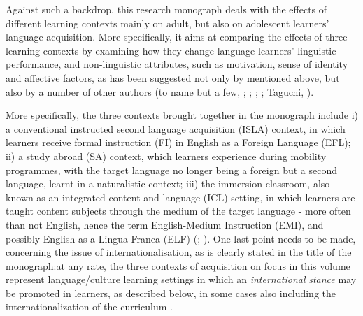 Against such a backdrop, this research monograph deals with the effects of different learning contexts mainly on adult, but also on adolescent learners’ language acquisition. More specifically, it aims at comparing the effects of three learning contexts by examining how they change language learners’ linguistic performance, and non-linguistic attributes, such as motivation, sense of identity and affective factors, as has been suggested not only by \citet{CollentineFreed2004b} mentioned above, but also by a number of other authors (to name but a few, \citealt{Pellegrino2005}; \citealt{Dewaele2007}; \citealt{Hernández2010}; \citealt{LasagabasterDoiz2014}; Taguchi, \citealt{XiaoLi2017}). 

More specifically, the three contexts brought together in the monograph include i) a conventional instructed second language acquisition (ISLA) context, in which learners receive formal instruction (FI) in English as a Foreign Language (EFL); ii) a study abroad (SA) context, which learners experience during mobility programmes, with the target language no longer being a foreign but a second language, learnt in a naturalistic context; iii) the immersion classroom, also known as an integrated content and language (ICL) setting, in which learners are taught content subjects through the medium of the target language - more often than not English, hence the term  English-Medium Instruction (EMI), and possibly English as a Lingua Franca (ELF) (\citealt{Björkman2013}; \citealt{House2013}). One last point needs to be made, concerning the issue of internationalisation, as is clearly stated in the title of the monograph:at any rate, the three contexts of acquisition on focus in this volume represent language/culture learning settings in which an \textit{international} \textit{stance} may be promoted in learners, as described below, in some cases also including the internationalization of the curriculum \citep{Leask2015}. 

